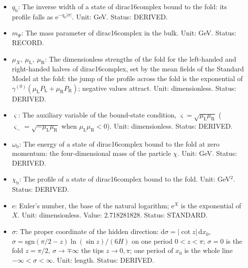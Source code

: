 \documentclass[
  10pt,
]{article}
\providecommand{\tightlist}{%
  \setlength{\itemsep}{0pt}\setlength{\parskip}{0pt}}
\begin{document}
\begin{itemize}
\tightlist
\item
  \(q_{\mathrm{b}}\): The inverse width of a state of dirac16complex
  bound to the fold: its profile falls as
  \(\mathrm{e}^{-q_{\mathrm{b}}\lvert\sigma\rvert}\). Unit: GeV. Status:
  DERIVED.
\item
  \(m_\Psi\): The mass parameter of dirac16complex in the bulk. Unit:
  GeV. Status: RECORD.
\item
  \(\mu_X,\ \mu_{\mathrm{L}},\ \mu_{\mathrm{R}}\): The dimensionless
  strengths of the fold for the left-handed and right-handed halves of
  dirac16complex, set by the mean fields of the Standard Model at the
  fold: the jump of the profile across the fold is the exponential of
  \(\gamma^{(0)}(\mu_{\mathrm{L}}P_{\mathrm{L}} + \mu_{\mathrm{R}}P_{\mathrm{R}})\);
  negative values attract. Unit: dimensionless. Status: DERIVED.
\item
  \(\varsigma\): The auxiliary variable of the bound-state condition,
  \(\varsigma = \sqrt{\mu_{\mathrm{L}}\mu_{\mathrm{R}}}\)
  (\(\varsigma_- = \sqrt{-\mu_{\mathrm{L}}\mu_{\mathrm{R}}}\) when
  \(\mu_{\mathrm{L}}\mu_{\mathrm{R}} < 0\)). Unit: dimensionless.
  Status: DERIVED.
\item
  \(\omega_{\mathrm{b}}\): The energy of a state of dirac16complex bound
  to the fold at zero momentum: the four-dimensional mass of the
  particle \(\chi\). Unit: GeV. Status: DERIVED.
\item
  \(\chi_{\mathrm{b}}\): The profile of a state of dirac16complex bound
  to the fold. Unit: GeV\(^{2}\). Status: DERIVED.
\item
  \(\mathrm{e}\): Euler's number, the base of the natural logarithm;
  \(\mathrm{e}^{X}\) is the exponential of \(X\). Unit: dimensionless.
  Value: 2.718281828. Status: STANDARD.
\item
  \(\sigma\): The proper coordinate of the hidden direction:
  \(\mathrm{d}\sigma = \lvert\cot z\rvert\,\mathrm{d}x_0\),
  \(\sigma = \mathrm{sgn}(\pi/2 - z)\ln(\sin z)/(6H)\) on one period
  \(0 < z < \pi\); \(\sigma = 0\) is the fold \(z = \pi/2\),
  \(\sigma \to \mp\infty\) the tips \(z \to 0, \pi\); one period of
  \(x_0\) is the whole line \(-\infty < \sigma < \infty\). Unit: length.
  Status: DERIVED.
\end{itemize}
\end{document}
